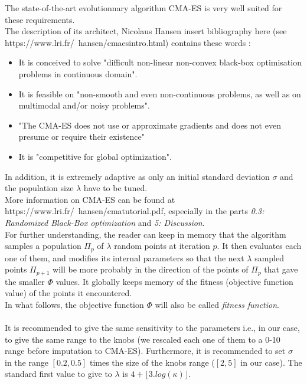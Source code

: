 The state-of-the-art evolutionnary algorithm CMA-ES is very well suited for these requirements.\\
The description of its architect, Nicolaus Hansen \color{blue}insert bibliography here\color{black} (see https://www.lri.fr/~hansen/cmaesintro.html) contains these words :
\begin{itemize}
	\item It is conceived to solve "difficult non-linear non-convex black-box optimisation problems in continuous domain". 
	\item It is feasible on "non-smooth and even non-continuous problems, as well as on multimodal and/or noisy problems".
	\item "The CMA-ES does not use or approximate gradients and does not even presume or require their existence"
	\item It is "competitive for global optimization".
\end{itemize}
In addition, it is extremely adaptive as only an initial standard deviation $\sigma$ and the population size $\lambda$ have to be tuned.\\
More information on CMA-ES can be found at https://www.lri.fr/~hansen/cmatutorial.pdf, especially in the parts \emph{0.3: Randomized Black-Box optimization} and \emph{5: Discussion}.\\
For further understanding, the reader can keep in memory that the algorithm samples a population $\Pi_{p}$ of $\lambda$ random points at iteration $p$. It then evaluates each one of them, and modifies its internal parameters so that the next $\lambda$ sampled points $\Pi_{p+1}$ will be more probably in the direction of the points of $\Pi_{p}$ that gave the smaller $\Phi$ values. It globally keeps memory of the fitness (objective function value) of the points it encountered.\\
In what follows, the objective function $\Phi$ will also be called \emph{fitness function}.\\
\\
It is recommended to give the same sensitivity to the parameters i.e., in our case, to give the same range to the knobs (we rescaled each one of them to a 0-10 range before imputation to CMA-ES). Furthermore, it is recommended to set $\sigma$ in the range $[0.2,0.5]$ times the size of the knobs range ($[2,5]$ in our case). The standard first value to give to $\lambda$ is $4+\lfloor3.log(\kappa)\rfloor$.


